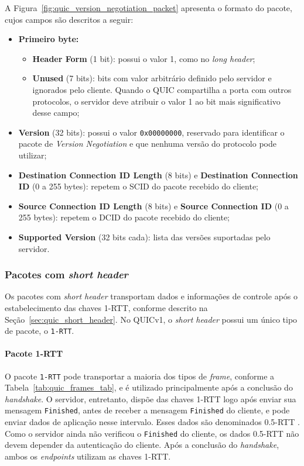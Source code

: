 A Figura~\ref{fig:quic_version_negotiation_packet} apresenta o formato do pacote, cujos campos são descritos a seguir:

\begin{itemize}
    \item \textbf{Primeiro byte:}
    \begin{itemize}
        \item \textbf{Header Form} (1 bit): possui o valor 1, como no \textit{long header};
        \item \textbf{Unused} (7 bits): bits com valor arbitrário definido pelo servidor e ignorados pelo cliente. Quando o QUIC compartilha a porta com outros protocolos, o servidor deve atribuir o valor 1 ao bit mais significativo desse campo;
    \end{itemize}
    \item \textbf{Version} (32 bits): possui o valor \texttt{0x00000000}, reservado para identificar o pacote de \textit{Version Negotiation} e que nenhuma versão do protocolo pode utilizar;
    \item \textbf{Destination Connection ID Length} (8 bits) e \textbf{Destination Connection ID} (0 a 255 bytes): repetem o SCID do pacote recebido do cliente;
    \item \textbf{Source Connection ID Length} (8 bits) e \textbf{Source Connection ID} (0 a 255 bytes): repetem o DCID do pacote recebido do cliente;
    \item \textbf{Supported Version} (32 bits cada): lista das versões suportadas pelo servidor.
\end{itemize}

\subsubsection{Pacotes com \textit{short header}}
\label{sec:quic_short_header_packets}

Os pacotes com \textit{short header} transportam dados e informações de controle após o estabelecimento das chaves 1-RTT, conforme descrito na Seção~\ref{sec:quic_short_header}. No QUICv1, o \textit{short header} possui um único tipo de pacote, o \texttt{1-RTT}.

\paragraph{Pacote 1-RTT}

O pacote \texttt{1-RTT} pode transportar a maioria dos tipos de \textit{frame}, conforme a Tabela~\ref{tab:quic_frames_tab}, e é utilizado principalmente após a conclusão do \textit{handshake}. O servidor, entretanto, dispõe das chaves 1-RTT logo após enviar sua mensagem \texttt{Finished}, antes de receber a mensagem \texttt{Finished} do cliente, e pode enviar dados de aplicação nesse intervalo. Esses dados são denominados 0.5-RTT \citep{rfc9001}. Como o servidor ainda não verificou o \texttt{Finished} do cliente, os dados 0.5-RTT não devem depender da autenticação do cliente. Após a conclusão do \textit{handshake}, ambos os \textit{endpoints} utilizam as chaves 1-RTT.

